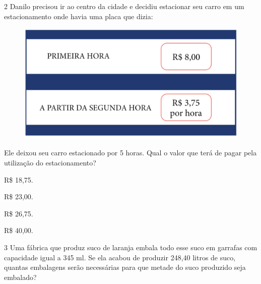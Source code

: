 \num{2} Danilo precisou ir ao centro da cidade e decidiu estacionar seu
carro em um estacionamento onde havia uma placa que dizia:

\begin{figure}[htpb!]
\centering
\includegraphics[width=.5\textwidth]{../ilustracoes/MAT5/SAEB_5ANO_MAT_figura89.png}
\end{figure}

Ele deixou seu carro estacionado por 5 horas. Qual o valor que terá de pagar pela utilização do estacionamento?

\begin{minipage}{.5\textwidth}
\begin{escolha}
\item
  R\$ 18,75.
\item
  R\$ 23,00.
\item
  R\$ 26,75.
\item
  R\$ 40,00.
\end{escolha}
\end{minipage}

\num{3} Uma fábrica que produz suco de laranja embala todo esse suco em
garrafas com capacidade igual a 345 ml. Se ela acabou de produzir 248,40
litros de suco, quantas embalagens serão necessárias para que metade do
suco produzido seja embalado?

